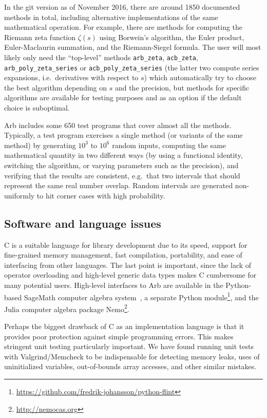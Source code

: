 \documentclass[10pt,journal,compsoc,cspaper]{IEEEtran}
\begin{document}
In the git version as of November 2016,
there are around 1850 documented methods in total, including
alternative implementations of the same mathematical operation.
For example, there are methods
for computing the Riemann zeta function $\zeta(s)$
using Borwein's algorithm, the Euler product, Euler-Maclaurin summation,
and the Riemann-Siegel formula.
The user will most likely only need the ``top-level'' methods \texttt{arb\_zeta}, \texttt{acb\_zeta},
\texttt{arb\_poly\_zeta\_series} or \texttt{acb\_poly\_zeta\_series} (the
latter two compute series expansions, i.e.\ derivatives with respect to $s$)
which automatically try to choose the best algorithm depending on $s$ and
the precision, but methods for specific algorithms are available
for testing purposes and
as an option if the default choice is suboptimal.

Arb includes some 650 test programs that cover almost all the methods.
Typically, a test program exercises a single method (or variants of
the same method) by generating $10^3$ to $10^6$ random inputs,
computing the same mathematical quantity in two different ways (by using a functional
identity, switching the algorithm, or varying parameters such as the precision),
and verifying that the results are consistent, e.g.\ that two
intervals that should represent the same real number overlap. Random intervals
are generated non-uniformly to hit corner cases with high probability.

\subsection{Software and language issues}

C is a suitable language for library development
due to its speed, support for fine-grained memory management,
fast compilation, portability, and ease of interfacing
from other languages.
The last point is important, since
the lack of operator overloading and high-level generic
data types makes C cumbersome for many potential users.
High-level interfaces
to Arb are available in the Python-based SageMath computer algebra system~\cite{sage},
a separate Python module\footnote{\url{https://github.com/fredrik-johansson/python-flint}},
and the Julia computer algebra package Nemo\footnote{\url{http://nemocas.org}}.

Perhaps the biggest drawback of C as an implementation language
is that it provides poor protection
against simple programming errors. This makes stringent unit testing
particularly important.
We have found running unit tests with
Valgrind/Memcheck \cite{nethercote2007valgrind} to be indispensable for
detecting memory leaks, uses of uninitialized variables,
out-of-bounds array accesses, and other similar mistakes.
\end{document}
